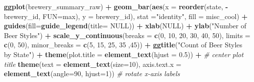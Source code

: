 \documentclass[]{article}
\newenvironment{Shaded}{\begin{snugshade}}{\end{snugshade}}
\newcommand{\KeywordTok}[1]{\textcolor[rgb]{0.13,0.29,0.53}{\textbf{#1}}}
\newcommand{\DataTypeTok}[1]{\textcolor[rgb]{0.13,0.29,0.53}{#1}}
\newcommand{\DecValTok}[1]{\textcolor[rgb]{0.00,0.00,0.81}{#1}}
\newcommand{\FloatTok}[1]{\textcolor[rgb]{0.00,0.00,0.81}{#1}}
\newcommand{\StringTok}[1]{\textcolor[rgb]{0.31,0.60,0.02}{#1}}
\newcommand{\CommentTok}[1]{\textcolor[rgb]{0.56,0.35,0.01}{\textit{#1}}}
\newcommand{\OtherTok}[1]{\textcolor[rgb]{0.56,0.35,0.01}{#1}}
\newcommand{\OperatorTok}[1]{\textcolor[rgb]{0.81,0.36,0.00}{\textbf{#1}}}
\newcommand{\NormalTok}[1]{#1}
\begin{document}
\begin{Shaded}
\begin{Highlighting}[]
\KeywordTok{ggplot}\NormalTok{(brewery_summary_raw) }\OperatorTok{+}
\StringTok{      }\KeywordTok{geom_bar}\NormalTok{(}\KeywordTok{aes}\NormalTok{(}\DataTypeTok{x =} \KeywordTok{reorder}\NormalTok{(state, }\OperatorTok{-}\NormalTok{brewery_id, }\DataTypeTok{FUN=}\NormalTok{max),}
                   \DataTypeTok{y =}\NormalTok{ brewery_id), }
               \DataTypeTok{stat =}\StringTok{"identity"}\NormalTok{,}
               \DataTypeTok{fill =}\NormalTok{ misc_cool) }\OperatorTok{+}
\StringTok{      }\KeywordTok{guides}\NormalTok{(}\DataTypeTok{fill=}\KeywordTok{guide_legend}\NormalTok{(}\DataTypeTok{title=} \OtherTok{NULL}\NormalTok{)) }\OperatorTok{+}
\StringTok{      }\KeywordTok{xlab}\NormalTok{(}\OtherTok{NULL}\NormalTok{) }\OperatorTok{+}
\StringTok{      }\KeywordTok{ylab}\NormalTok{(}\StringTok{"Number of Beer Styles"}\NormalTok{) }\OperatorTok{+}
\StringTok{      }\KeywordTok{scale_y_continuous}\NormalTok{(}\DataTypeTok{breaks =} \KeywordTok{c}\NormalTok{(}\DecValTok{0}\NormalTok{, }\DecValTok{10}\NormalTok{, }\DecValTok{20}\NormalTok{, }\DecValTok{30}\NormalTok{, }\DecValTok{40}\NormalTok{, }\DecValTok{50}\NormalTok{), }
                         \DataTypeTok{limits =} \KeywordTok{c}\NormalTok{(}\DecValTok{0}\NormalTok{, }\DecValTok{50}\NormalTok{), }
                         \DataTypeTok{minor_breaks =} \KeywordTok{c}\NormalTok{(}\DecValTok{5}\NormalTok{, }\DecValTok{15}\NormalTok{, }\DecValTok{25}\NormalTok{, }\DecValTok{35}\NormalTok{ ,}\DecValTok{45}\NormalTok{)) }\OperatorTok{+}
\StringTok{      }\KeywordTok{ggtitle}\NormalTok{(}\StringTok{"Count of Beer Styles by State"}\NormalTok{) }\OperatorTok{+}
\StringTok{      }\KeywordTok{theme}\NormalTok{(}\DataTypeTok{plot.title =} \KeywordTok{element_text}\NormalTok{(}\DataTypeTok{hjust =} \FloatTok{0.5}\NormalTok{)) }\OperatorTok{+}\StringTok{ }\CommentTok{# center plot title}
\StringTok{      }\KeywordTok{theme}\NormalTok{(}\DataTypeTok{text =} \KeywordTok{element_text}\NormalTok{(}\DataTypeTok{size=}\DecValTok{10}\NormalTok{),}
            \DataTypeTok{axis.text.x =} \KeywordTok{element_text}\NormalTok{(}\DataTypeTok{angle=}\DecValTok{90}\NormalTok{, }\DataTypeTok{hjust=}\DecValTok{1}\NormalTok{)) }\CommentTok{# rotate x-axis labels}
\end{Highlighting}
\end{Shaded}
\end{document}
